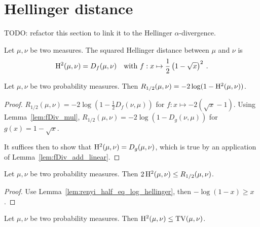 \section{Hellinger distance}

TODO: refactor this section to link it to the Hellinger $\alpha$-divergence.

\begin{definition}
  \label{def:Hellinger}
  Let $\mu, \nu$ be two measures. The squared Hellinger distance between $\mu$ and $\nu$ is
  \begin{align*}
    \operatorname{H^2}(\mu, \nu) = D_f(\mu, \nu) \quad \text{with } f: x \mapsto \frac{1}{2}\left( 1 - \sqrt{x} \right)^2 \: .
  \end{align*}
\end{definition}

\begin{lemma}
  \label{lem:renyi_half_eq_log_hellinger}
  Let $\mu, \nu$ be two probability measures. Then $R_{1/2}(\mu, \nu) = -2\log(1 - \operatorname{H^2}(\mu, \nu))$.
\end{lemma}

\begin{proof}
$R_{1/2}(\mu, \nu) = -2 \log (1 - \frac{1}{2} D_f(\nu, \mu))$ for $f : x \mapsto -2 (\sqrt{x} - 1)$. Using Lemma~\ref{lem:fDiv_mul}, $R_{1/2}(\mu, \nu) = -2 \log (1 - D_g(\nu, \mu))$ for $g(x) = 1 - \sqrt{x}$.

It suffices then to show that $\operatorname{H^2}(\mu, \nu) = D_g(\mu, \nu)$, which is true by an application of Lemma~\ref{lem:fDiv_add_linear}.
\end{proof}

\begin{lemma}
  \label{lem:hellinger_le_renyi}
  Let $\mu, \nu$ be two probability measures. Then $2 \operatorname{H^2}(\mu, \nu) \le R_{1/2}(\mu, \nu)$.
\end{lemma}

\begin{proof}
Use Lemma~\ref{lem:renyi_half_eq_log_hellinger}, then $-\log(1 - x) \ge x$.
\end{proof}

\begin{lemma}
  \label{lem:hellinger_le_tv}
  Let $\mu, \nu$ be two probability measures. Then $\operatorname{H^2}(\mu, \nu) \le \operatorname{TV}(\mu, \nu)$.
\end{lemma}


